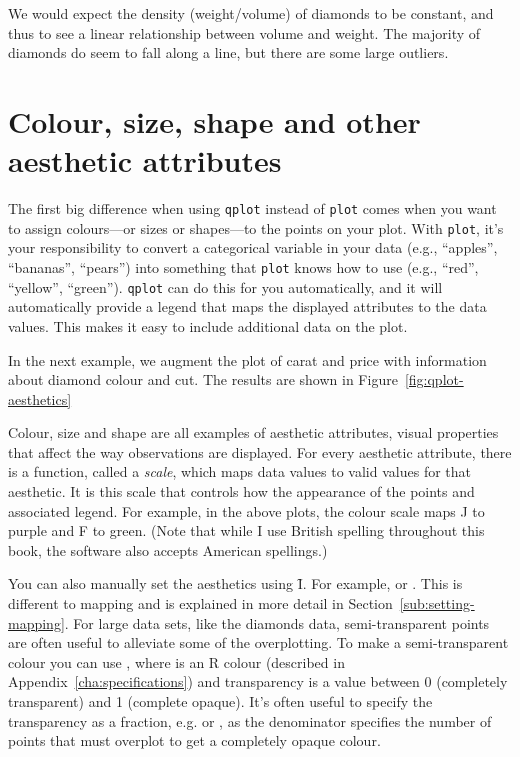 % 


We would expect the density (weight/volume) of diamonds to be constant, and thus to see a linear relationship between volume and weight. The majority of diamonds do seem to fall along a line, but there are some large outliers.

\section{Colour, size, shape and other aesthetic attributes}
\label{sec:aesthetic_attributes}

The first big difference when using {\tt qplot} instead of {\tt plot} comes when you want to assign colours---or sizes or shapes---to the points on your plot.  With {\tt plot}, it's your responsibility to convert a categorical variable in your data (e.g., ``apples'', ``bananas'', ``pears'') into something that {\tt plot} knows how to use (e.g., ``red'', ``yellow'', ``green'').  {\tt qplot} can do this for you automatically, and it will automatically provide a legend that maps the displayed attributes to the data values.  This makes it easy to include additional data on the plot.  

In the next example, we augment the plot of carat and price with information about diamond colour and cut.  The results are shown in Figure~\ref{fig:qplot-aesthetics}

% 


Colour, size and shape are all examples of aesthetic attributes, visual properties that affect the way observations are displayed.  For every aesthetic attribute, there is a function, called a \emph{scale}, which maps data values to valid values for that aesthetic.  It is this scale that controls how the appearance of the points and associated legend.  For example, in the above plots, the colour scale maps J to purple and F to green. (Note that while I use British spelling throughout this book, the software also accepts American spellings.)

You can also manually set the aesthetics using \f{I}.  For example,  or .  This is different to mapping and is explained in more detail in Section~\ref{sub:setting-mapping}.  For large data sets, like the diamonds data, semi-transparent points are often useful to alleviate some of the overplotting.  To make a semi-transparent colour you can use , where  is an R colour (described in Appendix~\ref{cha:specifications}) and transparency is a value between 0 (completely transparent) and 1 (complete opaque).  It's often useful to specify the transparency as a fraction, e.g.  or , as the denominator specifies the number of points that must overplot to get a completely opaque colour. 

